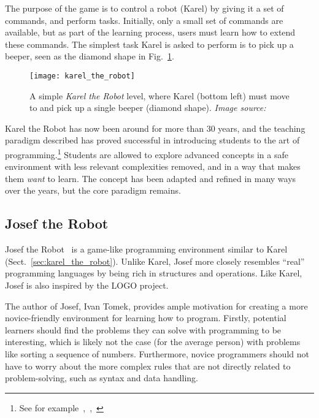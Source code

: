 \noindent
The purpose of the game is to control a robot (Karel) by giving it a set of commands, and perform tasks. Initially, only a small set of commands are available, but as part of the learning process, users must learn how to extend these commands. The simplest task Karel is asked to perform is to pick up a beeper, seen as the diamond shape in Fig.~\ref{fig:karel_the_robot}.

\begin{figure}[htp]
	\centering
	\texttt{[image: karel\_the\_robot]}
	\caption[Karel the Robot]{A simple \emph{Karel the Robot} level, where Karel (bottom left) must move to and pick up a single beeper (diamond shape). \emph{Image source:~\cite{roberts:karel_the_robot_java}}}
	\label{fig:karel_the_robot}
\end{figure}

\noindent
Karel the Robot has now been around for more than 30 years, and the teaching paradigm described has proved successful in introducing students to the art of programming.\footnote{See for example~\cite{krause:computer_science_air_force},~\cite{untch:karel_conventional_language},~\cite{becker:teaching_with_karel}} Students are allowed to explore advanced concepts in a safe environment with less relevant complexities removed, and in a way that makes them \emph{want} to learn. The concept has been adapted and refined in many ways over the years, but the core paradigm remains.

\subsection{Josef the Robot}
\label{sec:josef_the_robot}
Josef the Robot~\cite{tomek:josef_the_robot} is a game-like programming environment similar to Karel (Sect.~\ref{sec:karel_the_robot}). Unlike Karel, Josef more closely resembles ``real'' programming languages by being rich in structures and operations. Like Karel, Josef is also inspired by the LOGO project.

\noindent
The author of Josef, Ivan Tomek, provides ample motivation for creating a more novice-friendly environment for learning how to program. Firstly, potential learners should find the problems they can solve with programming to be interesting, which is likely not the case (for the average person) with problems like sorting a sequence of numbers. Furthermore, novice programmers should not have to worry about the more complex rules that are not directly related to problem-solving, such as syntax and data handling.

